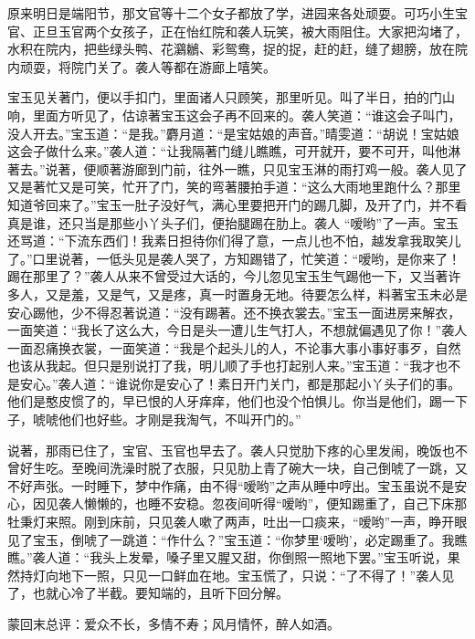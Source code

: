 \begin{parag}
    原来明日是端阳节，那文官等十二个女子都放了学，进园来各处顽耍。可巧小生宝官、正旦玉官两个女孩子，正在怡红院和袭人玩笑，被大雨阻住。大家把沟堵了，水积在院内，把些绿头鸭、花鸂鶒、彩鸳鸯，捉的捉，赶的赶，缝了翅膀，放在院内顽耍，将院门关了。袭人等都在游廊上嘻笑。
\end{parag}


\begin{parag}
    宝玉见关著门，便以手扣门，里面诸人只顾笑，那里听见。叫了半日，拍的门山响，里面方听见了，估谅著宝玉这会子再不回来的。袭人笑道：“谁这会子叫门，没人开去。”宝玉道：“是我。”麝月道：“是宝姑娘的声音。”晴雯道：“胡说！宝姑娘这会子做什么来。”袭人道：“让我隔著门缝儿瞧瞧，可开就开，要不可开，叫他淋著去。”说著，便顺著游廊到门前，往外一瞧，只见宝玉淋的雨打鸡一般。袭人见了又是著忙又是可笑，忙开了门，笑的弯著腰拍手道：“这么大雨地里跑什么？那里知道爷回来了。”宝玉一肚子没好气，满心里要把开门的踢几脚，及开了门，并不看真是谁，还只当是那些小丫头子们，便抬腿踢在肋上。袭人 “嗳哟”了一声。宝玉还骂道：“下流东西们！我素日担待你们得了意，一点儿也不怕，越发拿我取笑儿了。”口里说著，一低头见是袭人哭了，方知踢错了，忙笑道：“嗳哟，是你来了！踢在那里了？”袭人从来不曾受过大话的，今儿忽见宝玉生气踢他一下，又当著许多人，又是羞，又是气，又是疼，真一时置身无地。待要怎么样，料著宝玉未必是安心踢他，少不得忍著说道：“没有踢著。还不换衣裳去。”宝玉一面进房来解衣，一面笑道：“我长了这么大，今日是头一遭儿生气打人，不想就偏遇见了你！”袭人一面忍痛换衣裳，一面笑道：“我是个起头儿的人，不论事大事小事好事歹，自然也该从我起。但只是别说打了我，明儿顺了手也打起别人来。”宝玉道：“我才也不是安心。”袭人道：“谁说你是安心了！素日开门关门，都是那起小丫头子们的事。他们是憨皮惯了的，早已恨的人牙痒痒，他们也没个怕惧儿。你当是他们，踢一下子，唬唬他们也好些。才刚是我淘气，不叫开门的。”
\end{parag}


\begin{parag}
    说著，那雨已住了，宝官、玉官也早去了。袭人只觉肋下疼的心里发闹，晚饭也不曾好生吃。至晚间洗澡时脱了衣服，只见肋上青了碗大一块，自己倒唬了一跳，又不好声张。一时睡下，梦中作痛，由不得“嗳哟”之声从睡中哼出。宝玉虽说不是安心，因见袭人懒懒的，也睡不安稳。忽夜间听得“嗳哟”，便知踢重了，自己下床那牡秉灯来照。刚到床前，只见袭人嗽了两声，吐出一口痰来，“嗳哟”一声，睁开眼见了宝玉，倒唬了一跳道：“作什么？”宝玉道：“你梦里‘嗳哟’，必定踢重了。我瞧瞧。”袭人道：“我头上发晕，嗓子里又腥又甜，你倒照一照地下罢。”宝玉听说，果然持灯向地下一照，只见一口鲜血在地。宝玉慌了，只说：“了不得了！”袭人见了，也就心冷了半截。要知端的，且听下回分解。
\end{parag}


\begin{parag}
    \begin{note}蒙回末总评：爱众不长，多情不寿；风月情怀，醉人如酒。\end{note}
\end{parag}